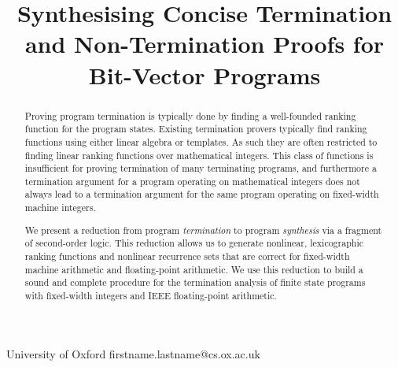 \documentclass[preprint]{sigplanconf}
\theoremstyle{definition}
\begin{document}
\setlength{\pdfpageheight}{\paperheight}
\setlength{\pdfpagewidth}{\paperwidth}





\title{Synthesising Concise Termination and Non-Termination Proofs for Bit-Vector Programs}

           {University of Oxford}
           {firstname.lastname@cs.ox.ac.uk}

\maketitle

\begin{abstract}
%
Proving program termination is typically done by finding a well-founded
ranking function for the program states.  Existing termination
provers typically find ranking functions using either linear algebra or
templates.  As such they are often restricted to finding linear ranking
functions over mathematical integers.  This class of functions is
insufficient for proving termination of many terminating programs, and
furthermore a termination argument for a program operating on mathematical
integers does not always lead to a termination argument for the same program
operating on fixed-width machine integers.

We present a reduction from program \emph{termination} to program
\emph{synthesis} via a fragment of second-order logic.  This reduction
allows us to generate nonlinear, lexicographic ranking functions and
nonlinear recurrence sets that are correct for fixed-width machine arithmetic
and floating-point arithmetic.  We use this reduction to build a sound and
complete procedure for the termination analysis of finite state programs with fixed-width
integers and IEEE floating-point arithmetic.
%
\end{abstract}
\end{document}
